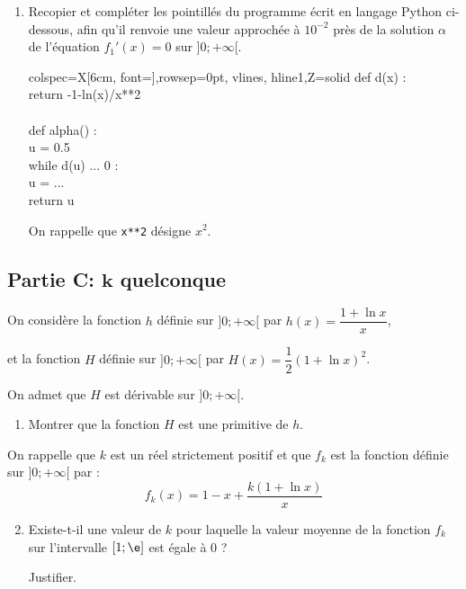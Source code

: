 \begin{enumerate}
\begin{enumerate}
				En déduire que $f_{1}$ admet un maximum sur l'intervalle $] 0 ;+\infty[$.

				\item Recopier et compléter les pointillés du programme écrit en langage Python ci-dessous, afin qu'il renvoie une valeur approchée à $10^{-2}$ près de la solution $\alpha$ de l'équation \quad $f_{1}'(x)=0$ \quad sur $] 0 ;+\infty[$.

				\begin{center}
				\begin{tblr}{colspec={X[6cm, font=\ttfamily]},rowsep=0pt, vlines, hline{1,Z}={solid}}
					def d(x) :\\
					\quad return -1-ln(x)/x**2\\
					\\
					def alpha() :\\
					\quad u = 0.5\\
					\quad while d(u) ... 0 :\\
					\quad \quad u = ...\\
					\quad return u\\
				\end{tblr}
				\end{center}

				On rappelle que \texttt{x**2} désigne $x^{2}$.
			\end{enumerate}

			\end{enumerate}

	\subsection*{Partie C: $\boldsymbol{k}$ quelconque}
		On considère la fonction $h$ définie sur $] 0 ;+\infty[$ par \quad
		$h(x)=\dfrac{1+\ln x}{x}$,

		et la fonction $H$ définie sur $] 0 ;+\infty[$ par \quad
		$H(x)=\dfrac{1}{2}(1+\ln x)^{2}$.

		On admet que $H$ est dérivable sur $] 0 ;+\infty[$.

		\begin{enumerate}
			\item Montrer que la fonction $H$ est une primitive de $h$.
		\end{enumerate}

		On rappelle que $k$ est un réel strictement positif et que $f_{k}$ est la fonction définie sur $] 0 ;+\infty[$ par :
		\[f_{k}(x)=1-x+\dfrac{k(1+\ln x)}{x}\]

		\begin{enumerate}
			\setcounter{enumi}{1}
			\item Existe-t-il une valeur de $k$ pour laquelle la valeur moyenne de la fonction $f_{k}$ sur l'intervalle $[ 1 ; \e]$ est égale à 0 ?

			Justifier.
		\end{enumerate}
